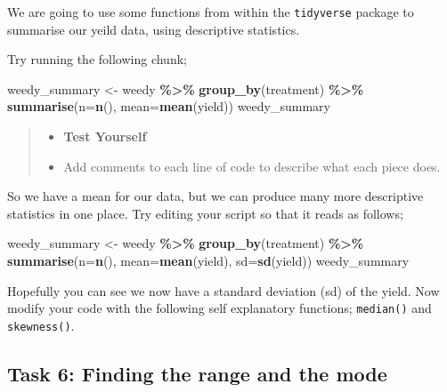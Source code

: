 \documentclass[
]{book}
\newenvironment{Shaded}{\begin{snugshade}}{\end{snugshade}}
\newcommand{\AttributeTok}[1]{\textcolor[rgb]{0.13,0.29,0.53}{#1}}
\newcommand{\FunctionTok}[1]{\textcolor[rgb]{0.13,0.29,0.53}{\textbf{#1}}}
\newcommand{\NormalTok}[1]{#1}
\newcommand{\OtherTok}[1]{\textcolor[rgb]{0.56,0.35,0.01}{#1}}
\newcommand{\SpecialCharTok}[1]{\textcolor[rgb]{0.81,0.36,0.00}{\textbf{#1}}}
\providecommand{\tightlist}{%
  \setlength{\itemsep}{0pt}\setlength{\parskip}{0pt}}
\begin{document}
We are going to use some functions from within the \texttt{tidyverse} package to summarise our yeild data, using descriptive statistics.

Try running the following chunk;

\begin{Shaded}
\begin{Highlighting}[]
\NormalTok{weedy\_summary }\OtherTok{\textless{}{-}}\NormalTok{ weedy }\SpecialCharTok{\%\textgreater{}\%} 
  \FunctionTok{group\_by}\NormalTok{(treatment) }\SpecialCharTok{\%\textgreater{}\%} 
  \FunctionTok{summarise}\NormalTok{(}\AttributeTok{n=}\FunctionTok{n}\NormalTok{(),}
            \AttributeTok{mean=}\FunctionTok{mean}\NormalTok{(yield))}
\NormalTok{weedy\_summary}
\end{Highlighting}
\end{Shaded}

\begin{quote}
\begin{itemize}
\tightlist
\item
  \textbf{Test Yourself}
\item
  Add comments to each line of code to describe what each piece does.
\end{itemize}
\end{quote}

So we have a mean for our data, but we can produce many more descriptive statistics in one place. Try editing your script so that it reads as follows;

\begin{Shaded}
\begin{Highlighting}[]
\NormalTok{weedy\_summary }\OtherTok{\textless{}{-}}\NormalTok{ weedy }\SpecialCharTok{\%\textgreater{}\%} 
  \FunctionTok{group\_by}\NormalTok{(treatment) }\SpecialCharTok{\%\textgreater{}\%} 
  \FunctionTok{summarise}\NormalTok{(}\AttributeTok{n=}\FunctionTok{n}\NormalTok{(),}
            \AttributeTok{mean=}\FunctionTok{mean}\NormalTok{(yield),}
            \AttributeTok{sd=}\FunctionTok{sd}\NormalTok{(yield))}
\NormalTok{weedy\_summary}
\end{Highlighting}
\end{Shaded}

Hopefully you can see we now have a standard deviation (sd) of the yield. Now modify your code with the following self explanatory functions; \texttt{median()} and \texttt{skewness()}.

\subsection{Task 6: Finding the range and the mode}\label{task-6-finding-the-range-and-the-mode}
\end{document}

